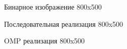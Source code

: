 \documentclass{report}
\begin{document}
\begin{figure}[H]
\caption{Бинарное изображение 800x500}
\end{figure}

\begin{figure}[H]
\caption{Последовательная реализация 800x500}
\end{figure}

\begin{figure}[H]
\caption{OMP реализация 800x500}
\end{figure}
\end{document}
